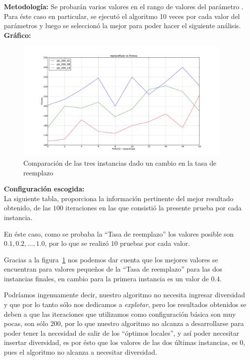 \textbf{Metodología:} Se probarán varios valores en el rango de valores del parámetro \blue{[0,1]}.
Para éste caso en particular, se ejecutó el algoritmo 10 veces por cada valor del parámetros y luego se seleccionó la mejor
para poder hacer el siguiente análisis.\\

\textbf{Gráfico:}\\

\begin{figure}[h!]
\begin{center}
	\includegraphics[width=0.95\textwidth]{img/3.pdf}
	\caption{Comparaci\'on de las tres instancias dado un cambio en la tasa de reemplazo}
	\label{fig:3}
\end{center}
\end{figure}

\textbf{Configuración escogida:}\\

La siguiente tabla, proporciona la información pertinente del mejor resultado obtenido,
de las $100$ iteraciones en las que consistió la presente prueba por cada instancia.

En éste caso, como se probaba la ``Tasa de reemplazo'' los valores posible son $0.1, 0.2, \ldots, 1.0$,
por lo que se realizó $10$ pruebas por cada valor.

Gracias a la figura~\ref{fig:3} nos podemos dar cuenta que los mejores valores se encuentran
para valores pequeños de la ``Tasa de reemplazo'' para las dos instancias finales, en cambio
para la primera instancia es un valor de $0.4$.

Podríamos ingenuamente decir, nuestro algoritmo no necesita ingresar diversidad y que por lo tanto
sólo nos dedicamos a \emph{explotar}, pero los resultados obtenidos se deben a que las iteraciones
que utilizamos como configuración básica son muy pocas, son sólo $200$, por lo que nuestro algoritmo
no alcanza a desarrollarse para poder tener la necesidad de salir de los ``óptimos locales'',
y así poder necesitar insertar diversidad, es por ésto que los valores de las dos últimas instancias,
es 0, pues el algoritmo no alcanza a necesitar diversidad.

